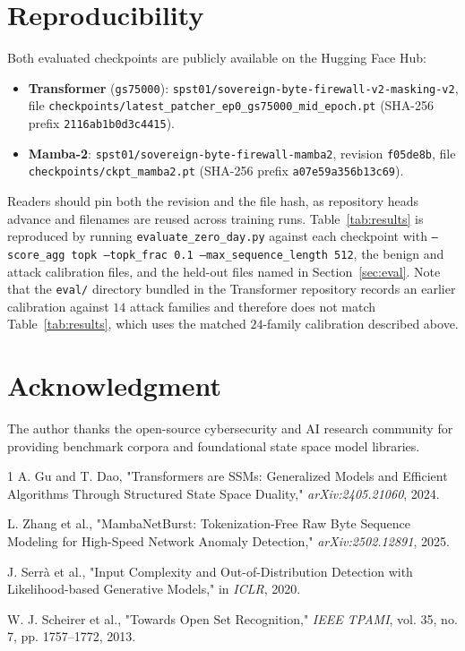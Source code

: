 \documentclass[10pt,journal,compsoc]{IEEEtran}
\begin{document}
\section*{Reproducibility}
Both evaluated checkpoints are publicly available on the Hugging Face Hub:
\begin{itemize}
    \item \textbf{Transformer} (\texttt{gs75000}): \texttt{spst01/sovereign-byte-firewall-v2-masking-v2}, file \texttt{checkpoints/latest\_patcher\_ep0\_gs75000\_mid\_epoch.pt} (SHA-256 prefix \texttt{2116ab1b0d3c4415}).
    \item \textbf{Mamba-2}: \texttt{spst01/sovereign-byte-firewall-mamba2}, revision \texttt{f05de8b}, file \texttt{checkpoints/ckpt\_mamba2.pt} (SHA-256 prefix \texttt{a07e59a356b13c69}).
\end{itemize}
Readers should pin both the revision and the file hash, as repository heads advance and filenames are reused across training runs. Table~\ref{tab:results} is reproduced by running \texttt{evaluate\_zero\_day.py} against each checkpoint with \texttt{--score\_agg topk --topk\_frac 0.1 --max\_sequence\_length 512}, the benign and attack calibration files, and the held-out files named in Section~\ref{sec:eval}. Note that the \texttt{eval/} directory bundled in the Transformer repository records an earlier calibration against $14$ attack families and therefore does not match Table~\ref{tab:results}, which uses the matched $24$-family calibration described above.

\section*{Acknowledgment}
The author thanks the open-source cybersecurity and AI research community for providing benchmark corpora and foundational state space model libraries.


\begin{thebibliography}{1}
A. Gu and T. Dao, "Transformers are SSMs: Generalized Models and Efficient Algorithms Through Structured State Space Duality," \textit{arXiv:2405.21060}, 2024.

L. Zhang et al., "MambaNetBurst: Tokenization-Free Raw Byte Sequence Modeling for High-Speed Network Anomaly Detection," \textit{arXiv:2502.12891}, 2025.

J. Serr{\`a} et al., "Input Complexity and Out-of-Distribution Detection with Likelihood-based Generative Models," in \textit{ICLR}, 2020.

W. J. Scheirer et al., "Towards Open Set Recognition," \textit{IEEE TPAMI}, vol. 35, no. 7, pp. 1757--1772, 2013.
\end{thebibliography}
\end{document}
